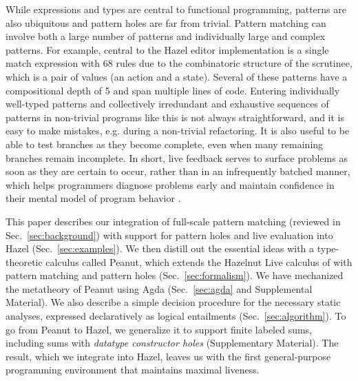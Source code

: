 While expressions and types are central to functional programming, patterns are also ubiquitous and pattern holes are far from trivial. Pattern matching can involve both a large number of patterns and individually large and complex patterns. For example, central to the Hazel editor implementation is a single match expression with 68 rules due to the combinatoric structure of the scrutinee, which is a pair of values (an action and a state). Several of these patterns have a compositional depth of 5 and span multiple lines of code. Entering individually well-typed patterns and collectively irredundant and exhaustive sequences of patterns in non-trivial programs like this is not always straightforward, and it is easy to make mistakes, e.g. during a non-trivial refactoring. It is also useful to be able to test branches as they become complete, even when many remaining branches remain incomplete. In short, live feedback serves to surface problems as soon as they are certain to occur, rather than in an infrequently batched manner, which helps programmers diagnose problems early and maintain confidence in their mental model of program behavior \cite{tanimoto2013perspective}.

This paper describes our integration of full-scale pattern matching (reviewed in Sec.~\ref{sec:background}) with support for pattern holes and live evaluation into Hazel (Sec.~\ref{sec:examples}). We then distill out the essential ideas with a type-theoretic calculus called Peanut, which extends the Hazelnut Live calculus of \citet{DBLP:journals/pacmpl/OmarVCH19} with pattern matching and pattern holes (Sec.~\ref{sec:formalism}). We have mechanized the metatheory of Peanut using Agda (Sec.~\ref{sec:agda} and Supplemental Material). We also describe a simple decision procedure for the necessary static analyses, expressed declaratively as logical entailments (Sec.~\ref{sec:algorithm}). To go from Peanut to Hazel, we generalize it to support finite labeled sums, including sums with \emph{datatype constructor holes} (Supplementary Material). The result, which we integrate into Hazel, leaves us with the first general-purpose programming environment that maintains maximal liveness.

